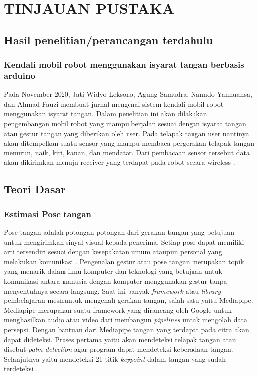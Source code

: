 \section{TINJAUAN PUSTAKA}

\subsection{Hasil penelitian/perancangan terdahulu}
\subsubsection{Kendali mobil robot menggunakan isyarat tangan berbasis arduino}
Pada November 2020, Jati Widyo Leksono, Agung Samudra, Nanndo Yannuansa, dan Ahmad Fauzi membuat jurnal mengenai sistem kendali mobil robot menggunakan isyarat tangan. Dalam penelitian ini akan dilakukan pengembangan mobil robot yang mampu berjalan sesuai dengan isyarat tangan atau gestur tangan yang diberikan oleh user. Pada telapak tangan user nantinya akan ditempelkan suatu sensor yang mampu membaca pergerakan telapak tangan menurun, naik, kiri, kanan, dan mendatar. Dari pembacaan sensor tersebut data akan dikirimkan menuju receiver yang terdapat pada robot secara wireless \parencite{JurnalElectroLuecat}.

\subsection{Teori Dasar}
\subsubsection{Estimasi Pose tangan}
Pose tangan adalah potongan-potongan dari gerakan tangan yang betujuan untuk mengirimkan sinyal visual kepada penerima. Setiap pose dapat memiliki arti tersendiri sesuai dengan kesepakatan umum ataupun personal yang melakukan komunikasi \parencite{gesturtangan}. Pengenalan gestur atau pose tangan merupakan topik yang menarik dalam ilmu komputer dan teknologi yang betujuan untuk komunikasi antara manusia dengan komputer menggunakan gestur tanpa menyentuhnya secara langsung. Saat ini banyak \textit{framework} atau \textit{library} pembelajaran mesinuntuk mengenali gerakan tangan, salah satu yaitu Mediapipe. Mediapipe merupakan suatu framework yang dirancang oleh Google untuk menghasilkan audio atau video dari membangun \textit{pipelines} untuk mengolah data persepsi. Dengan bantuan dari Mediapipe tangan yang terdapat pada citra akan dapat dideteksi. Proses pertama yaitu akan mendeteksi telapak tangan atau disebut \textit{palm detection} agar program dapat mendeteksi keberadaan tangan. Selanjutnya yaitu mendeteksi 21 titik \textit{keypoint} dalam tangan yang sudah terdeteksi \parencite{UniversitasDinamika}. 

